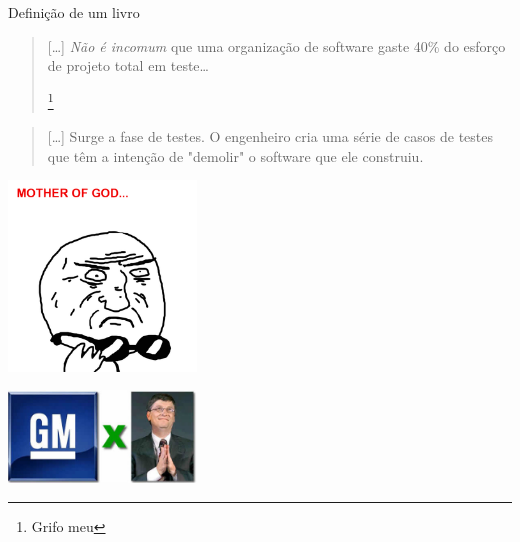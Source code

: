 \begin{frame}
  \begin{center}
    \Huge Definição de um livro
  \end{center}
\end{frame}

\begin{frame}{\subsecname}
  \blockquote[{\cite[Pressman]{pressman_engenharia_1995}}]{
    [\ldots] \emph{Não é incomum} que uma organização de software gaste 40\%
    do esforço de projeto total em teste\ldots

    \let\thefootnote\relax\footnote{Grifo meu}
  }
\end{frame}

\begin{frame}{\subsecname}
  \blockquote[{\cite[Pressman]{pressman_engenharia_1995}}]{
    [\ldots] Surge a fase de testes. O engenheiro cria uma série de casos de testes
    que têm a intenção de "demolir" o software que ele construiu.
  }
\end{frame}

\begin{frame}{\subsecname}
  \begin{center}
    \includegraphics[width=5cm]{images/mother-of-god}
  \end{center}
\end{frame}

\begin{frame}{\subsecname}
  \begin{center}
    \includegraphics[width=5cm]{images/bill_gm}
  \end{center}
\end{frame}

